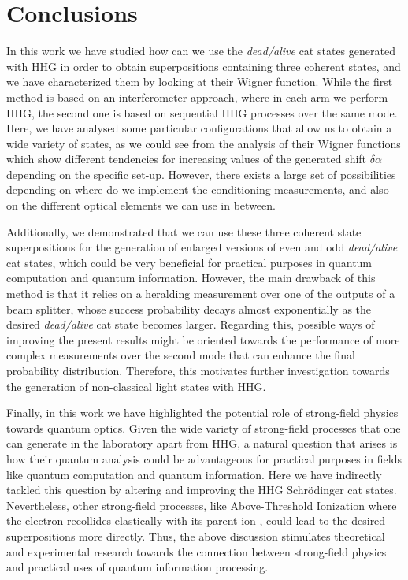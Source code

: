 \section{Conclusions}\label{Conclusions}
In this work we have studied how can we use the \emph{dead/alive} cat states generated with HHG in order to obtain superpositions containing three coherent states, and we have characterized them by looking at their Wigner function. While the first method is based on an interferometer approach, where in each arm we perform HHG, the second one is based on sequential HHG processes over the same mode. Here, we have analysed some particular configurations that allow us to obtain a wide variety of states, as we could see from the analysis of their Wigner functions which show different tendencies for increasing values of the generated shift $\delta \alpha$ depending on the specific set-up. However, there exists a large set of possibilities depending on where do we implement the conditioning measurements, and also on the different optical elements we can use in between.

Additionally, we demonstrated that we can use these three coherent state superpositions for the generation of enlarged versions of even and odd \emph{dead/alive} cat states, which could be very beneficial for practical purposes in quantum computation and quantum information. However, the main drawback of this method is that it relies on a heralding measurement over one of the outputs of a beam splitter, whose success probability decays almost exponentially as the desired \emph{dead/alive} cat state becomes larger. Regarding this, possible ways of improving the present results might be oriented towards the performance of more complex measurements over the second mode that can enhance the final probability distribution. Therefore, this motivates further investigation towards the generation of non-classical light states with HHG.

Finally, in this work we have highlighted the potential role of strong-field physics towards quantum optics. Given the wide variety of strong-field processes that one can generate in the laboratory apart from HHG, a natural question that arises is how their quantum analysis could be advantageous for practical purposes in fields like quantum computation and quantum information. Here we have indirectly tackled this question by altering and improving the HHG Schrödinger cat states. Nevertheless, other strong-field processes, like Above-Threshold Ionization where the electron recollides elastically with its parent ion \cite{Faria2020}, could lead to the desired superpositions more directly. Thus, the above discussion stimulates theoretical and experimental research towards the connection between strong-field physics and practical uses of quantum information processing. 




